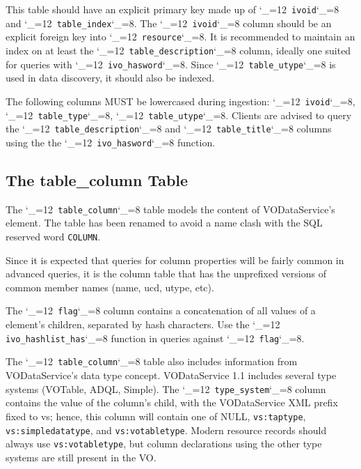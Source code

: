 \documentclass[11pt,a4paper]{ivoa}
\makeatletter
\def\rtent#1{\texttt{\color{rtcolor}\verb|#1|}}
\def\makeunderscoreletter{\catcode`\_=12}
\def\makeunderscoresubscript{\catcode`\_=8}
\def\rtent{\makeunderscoreletter\relax\rt@nt}
\def\rt@nt#1{\texttt{\color{rtcolor} #1}\makeunderscoresubscript{}}
\makeatother
\begin{document}



This table should have an explicit primary key made up of
\rtent{ivoid} and \rtent{table_index}.  The
\rtent{ivoid} column should be an explicit
foreign key into \rtent{resource}.  It is recommended to
maintain an index on at least the \rtent{table_description}
column, ideally one suited for queries with \rtent{ivo_hasword}.  Since
\rtent{table_utype} is used in data discovery, it should also be indexed.

The following columns MUST be lowercased during ingestion:
\rtent{ivoid}, \rtent{table_type},
\rtent{table_utype}.
Clients are advised to query the \rtent{table_description}
and \rtent{table_title}  columns
using the the \rtent{ivo_hasword} function.



\subsection{The table\_column Table}

\label{table_table_column}

The \rtent{table_column}  table models the content of VODataService's
 element.  The table has been renamed to avoid
a name clash with the SQL reserved word \texttt{COLUMN}.

Since it is expected that queries for column properties will be
fairly common in advanced queries, it is the column table that has the
unprefixed versions of common member names (name,  ucd,
utype, etc).

The \rtent{flag} column contains a concatenation of all values
of a  element's  children, separated
by hash characters.  Use the \rtent{ivo_hashlist_has} function in
queries against \rtent{flag}.

The \rtent{table_column} table also includes information from
VODataService's data type concept.  VODataService 1.1 includes several type
systems (VOTable, ADQL, Simple).  The
\rtent{type_system} column contains the value of the column's
 child, with the VODataService XML prefix fixed
to vs; hence, this column will contain one of NULL,
\texttt{vs:taptype},
\texttt{vs:simpledatatype}, and \texttt{vs:votabletype}.  Modern
resource records should always use \texttt{vs:votabletype}, but
column declarations using the other type systems are still present in
the VO.


\end{document}
